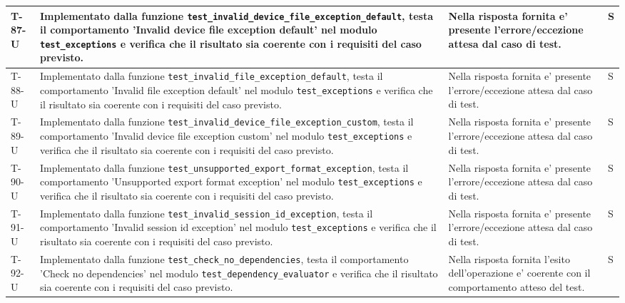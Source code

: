 \documentclass[a4paper,12pt]{article}
\begin{document}
{{\begin{longtable}{|>{\RaggedRight\arraybackslash}p{1.55cm}|>{\RaggedRight\arraybackslash}p{8.0cm}|>{\RaggedRight\arraybackslash}p{4.6cm}|>{\RaggedRight\arraybackslash}p{1.2cm}|}
        \hline
        T-87-U & Implementato dalla funzione \texttt{test\_\allowbreak invalid\_\allowbreak device\_\allowbreak file\_\allowbreak exception\_\allowbreak default}, testa il comportamento 'Invalid device file exception default' nel modulo \texttt{test\_\allowbreak exceptions} e verifica che il risultato sia coerente con i requisiti del caso previsto. & Nella risposta fornita e' presente l'errore/eccezione attesa dal caso di test. & S \\
        \hline
        T-88-U & Implementato dalla funzione \texttt{test\_\allowbreak invalid\_\allowbreak file\_\allowbreak exception\_\allowbreak default}, testa il comportamento 'Invalid file exception default' nel modulo \texttt{test\_\allowbreak exceptions} e verifica che il risultato sia coerente con i requisiti del caso previsto. & Nella risposta fornita e' presente l'errore/eccezione attesa dal caso di test. & S \\
        \hline
        T-89-U & Implementato dalla funzione \texttt{test\_\allowbreak invalid\_\allowbreak device\_\allowbreak file\_\allowbreak exception\_\allowbreak custom}, testa il comportamento 'Invalid device file exception custom' nel modulo \texttt{test\_\allowbreak exceptions} e verifica che il risultato sia coerente con i requisiti del caso previsto. & Nella risposta fornita e' presente l'errore/eccezione attesa dal caso di test. & S \\
        \hline
        T-90-U & Implementato dalla funzione \texttt{test\_\allowbreak unsupported\_\allowbreak export\_\allowbreak format\_\allowbreak exception}, testa il comportamento 'Unsupported export format exception' nel modulo \texttt{test\_\allowbreak exceptions} e verifica che il risultato sia coerente con i requisiti del caso previsto. & Nella risposta fornita e' presente l'errore/eccezione attesa dal caso di test. & S \\
        \hline
        T-91-U & Implementato dalla funzione \texttt{test\_\allowbreak invalid\_\allowbreak session\_\allowbreak id\_\allowbreak exception}, testa il comportamento 'Invalid session id exception' nel modulo \texttt{test\_\allowbreak exceptions} e verifica che il risultato sia coerente con i requisiti del caso previsto. & Nella risposta fornita e' presente l'errore/eccezione attesa dal caso di test. & S \\
        \hline
        T-92-U & Implementato dalla funzione \texttt{test\_\allowbreak check\_\allowbreak no\_\allowbreak dependencies}, testa il comportamento 'Check no dependencies' nel modulo \texttt{test\_\allowbreak dependency\_\allowbreak evaluator} e verifica che il risultato sia coerente con i requisiti del caso previsto. & Nella risposta fornita l'esito dell'operazione e' coerente con il comportamento atteso del test. & S \\

\end{longtable}}}
\end{document}
